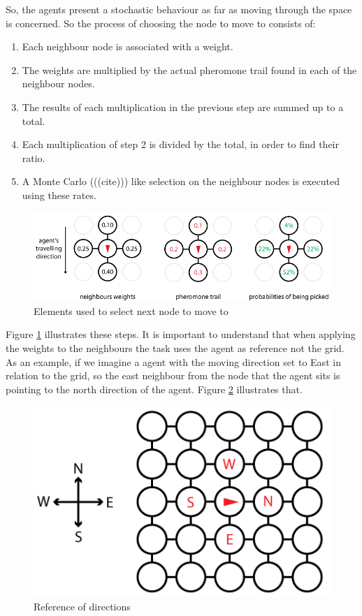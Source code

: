 So, the agents present a stochastic behaviour as far as moving through the space is concerned. So the process of choosing the node to move to consists of: 

\begin{enumerate}
  \item Each neighbour node is associated with a weight.
  \item The weights are multiplied by the actual pheromone trail found in  each of the neighbour nodes.
  \item The results of each multiplication in the previous step are summed up to a total.
  \item Each multiplication of step 2 is divided by the total, in order to find their ratio.
  \item A Monte Carlo (((cite))) like selection on the neighbour nodes is executed using these rates.
\end{enumerate}

\begin{figure}[H]
  \centering
  \includegraphics[width=0.9\linewidth]{gfx/choosing-next-node.png}
  \caption{Elements used to select next node to move to}
  \label{fig:choosing-next-node}
\end{figure}

Figure \ref{fig:choosing-next-node} illustrates these steps. It is important to understand that when applying the weights to the neighbours the task uses the agent as reference not the grid. As an example, if we imagine a agent with the moving direction set to East in relation to the grid, so the east neighbour from the node that the agent sits is pointing to the north direction of the agent. Figure \ref{fig:position-reference} illustrates that.

\begin{figure}[H]
  \centering
  \includegraphics[width=0.5\linewidth]{gfx/reference.png}
  \caption{Reference of directions}
  \label{fig:position-reference}
\end{figure}

